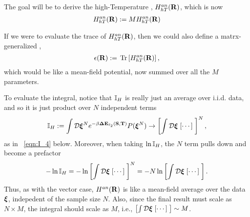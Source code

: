 The goal will be to derive the high-Temperature \AnnealedHamiltonian, $H^{an}_{hT}(\mathbf{R})$, which is now
\begin{align}
 \label{eqn:hanpp}
  H^{an}_{hT}(\mathbf{R}):=MH^{an}_{hT}(\mathbf{R})
\end{align}

If we were to evaluate the trace of $H^{an}_{hT}(\mathbf{R})$, then we could also define
a matrx-generalized \EffectivePotential,
\begin{align}
  \label{eqn:EPSL_mat}
  \epsilon(\mathbf{R}):=\mbox{}\operatorname{Tr}\left[H^{an}_{hT}(\mathbf{R})\right],
\end{align}
which would be like a mean-field potential, now summed over all the $M$ parameters.


To evaluate the integral, notice that $\mathbb{I}_{H}$ is really just an average over i.i.d. data, and so it is just product over $N$ independent terms
\begin{align}
\mathbb{I}_{H} := \int\mathcal{D}\boldsymbol{\xi}^{N}  e^{-\beta \mathbf{\Delta {E}}_{\ell_2}({\mathbf{S}},{\mathbf{T}})} P(\boldsymbol{\xi}^{N})  \rightarrow\left[\int\mathcal{D}\boldsymbol{\xi} \;[\cdots]\; \right]^{N} ,
\end{align}
as in \EQN~\ref{eqn:I_4} below.
Moreover, when taking $\ln \mathbb{I}_{H}$, the $N$ term pulls down and become a prefactor
\begin{align}
-\ln \mathbb{I}_{H} = -\ln\left[\int\mathcal{D}\boldsymbol{\xi} \;[\cdots]\; \right]^{N}= -N\ln\left[\int\mathcal{D}\boldsymbol{\xi} \;[\cdots]\; \right] .
\end{align}
Thus, as with the vector case, $H^{an}(\mathbf{R})$ is like a mean-field average over the data $\boldsymbol{\xi}$, indepedent of the sample size $N$.
Also, since the final result must scale as $N\times M$, the integral should scale as $M$, i.e.,
$\left[\int\mathcal{D}\boldsymbol{\xi} \;[\cdots]\; \right]\sim M$.



